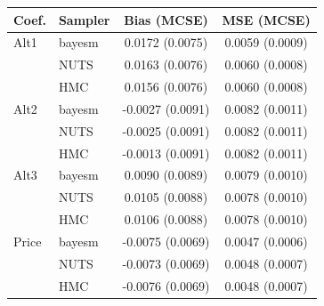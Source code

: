 \begin{tabular}{llcc}
\toprule
Coef. & Sampler & Bias (MCSE) & MSE (MCSE) \\
\midrule
Alt1 & bayesm & 0.0172 (0.0075) & 0.0059 (0.0009) \\
 & NUTS & 0.0163 (0.0076) & 0.0060 (0.0008) \\
 & HMC & 0.0156 (0.0076) & 0.0060 (0.0008) \\
Alt2 & bayesm & -0.0027 (0.0091) & 0.0082 (0.0011) \\
 & NUTS & -0.0025 (0.0091) & 0.0082 (0.0011) \\
 & HMC & -0.0013 (0.0091) & 0.0082 (0.0011) \\
Alt3 & bayesm & 0.0090 (0.0089) & 0.0079 (0.0010) \\
 & NUTS & 0.0105 (0.0088) & 0.0078 (0.0010) \\
 & HMC & 0.0106 (0.0088) & 0.0078 (0.0010) \\
Price & bayesm & -0.0075 (0.0069) & 0.0047 (0.0006) \\
 & NUTS & -0.0073 (0.0069) & 0.0048 (0.0007) \\
 & HMC & -0.0076 (0.0069) & 0.0048 (0.0007) \\
\bottomrule
\end{tabular}
